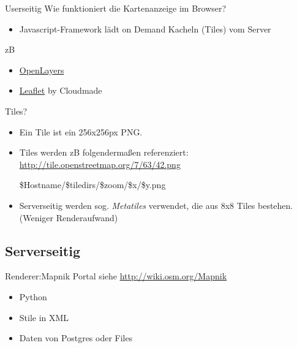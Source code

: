 \documentclass{beamer}
\begin{document}
\begin{frame}{Userseitig}
Wie funktioniert die Kartenanzeige im Browser?
\pause

\begin{itemize}
  \item Javascript-Framework lädt on Demand Kacheln (Tiles) vom Server
\end{itemize}
zB
\begin{itemize}
  \item \href{http://www.openlayers.org/}{OpenLayers}
  \item \href{http://leaflet.cloudmade.com/}{Leaflet} by Cloudmade
\end{itemize}

\end{frame}

\begin{frame}{Tiles?}
  \begin{itemize}
        \item Ein Tile ist ein 256x256px PNG.

        \item Tiles werden zB folgendermaßen referenziert:
  \url{http://tile.openstreetmap.org/7/63/42.png}
  
  \$Hostname/\$tiledirs/\$zoom/\$x/\$y.png

	\item Serverseitig werden sog. \emph{Metatiles} verwendet, die aus 8x8 Tiles bestehen. (Weniger Renderaufwand)
  \end{itemize}

\end{frame}

\subsection{Serverseitig}
\begin{frame}{Renderer:Mapnik}
  Portal siehe \url{http://wiki.osm.org/Mapnik}
  \begin{itemize}
              \item Python
              \item Stile in XML
              \item Daten von Postgres oder Files
            \end{itemize}

\end{frame}
\end{document}

